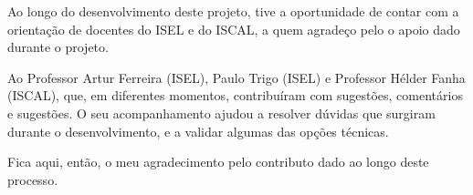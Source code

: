 




Ao longo do desenvolvimento deste projeto, tive a oportunidade de contar com a orientação de docentes do ISEL e do ISCAL, a quem agradeço pelo o apoio dado durante o projeto. 

Ao Professor Artur Ferreira (ISEL), Paulo Trigo (ISEL) e  Professor Hélder Fanha (ISCAL), que, em diferentes momentos, contribuíram com sugestões, comentários e sugestões. O seu acompanhamento ajudou a resolver dúvidas que surgiram durante o desenvolvimento, e a validar algumas das opções técnicas.

Fica aqui, então, o meu agradecimento pelo contributo dado ao longo deste processo.

